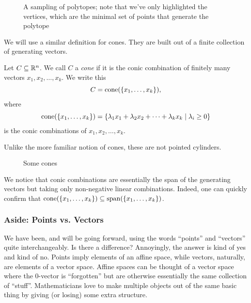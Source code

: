 \documentclass[12pt,oneside]{../../sfsuthesis}
\begin{document}
\begin{figure}[H]
\begin{subfigure}[t]{0.4\textwidth}
    \end{subfigure}
    \caption{A sampling of polytopes; note that we've only highlighted the vertices, which are the minimal set of points that generate the polytope }
\end{figure}

We will use a similar definition for cones.
They are built out of a finite collection of generating vectors.
\begin{definition}[Cone]\th\label{def:cone}
    Let \( C \subseteq \mathbb{R}^n \).
    We call \( C \) a \emph{cone} if it is the conic combination of finitely many vectors \( x_1, x_2, \dots, x_k \).
    We write this
    \[
        C = \mathrm{cone}(\{x_1, \dots, x_k\}),
    \]
    where
    \[
        \mathrm{cone}(\{x_1, \dots, x_k\}) = \left\{ \lambda_1 x_1 + \lambda_2 x_2 + \cdots + \lambda_k x_k \; \middle| \; \lambda_i \geq 0 \right\}
    \]
    is the conic combinations of \( x_1, x_2, \dots, x_k \).

\end{definition}
Unlike the more familiar notion of cones, these are not pointed cylinders.
\begin{figure}[H]
    \centering
    \caption{Some cones}
\end{figure}
We notice that conic combinations are essentially the span of the generating vectors but taking only non-negative linear combinations.
Indeed, one can quickly confirm that \( \mathrm{cone}(\{x_1, \dots, x_k\}) \subseteq \operatorname{span}(\{x_1, \dots, x_k\}) \).

\subsubsection{Aside: Points vs. Vectors}
We have been, and will be going forward, using the words ``points'' and ``vectors'' quite interchangeably.
Is there a difference?
Annoyingly, the answer is kind of yes and kind of no.
Points imply elements of an affine space, while vectors, naturally, are elements of a vector space.
Affine spaces can be thought of a vector space where the \( 0 \)-vector is ``forgotten'' but are otherwise essentially the same collection of ``stuff''.
Mathematicians love to make multiple objects out of the same basic thing by giving (or losing) some extra structure.
\end{document}
